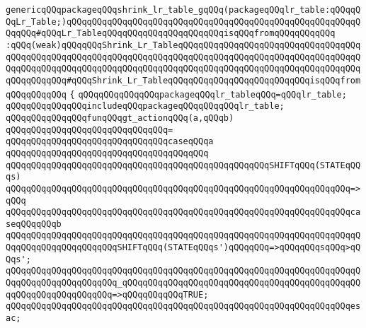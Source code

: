 \verb|genericqQQqpackageqQQqshrink_lr_table_gqQQq(packageqQQqlr_table:qQQqqQQqLr_Table;)qQQqqQQqqQQqqQQqqQQqqQQqqQQqqQQqqQQqqQQqqQQqqQQqqQQqqQQqqQQqqQQq#qQQqLr_TableqQQqqQQqqQQqqQQqqQQqqQQqisqQQqfromqQQqqQQqqQQq|\newline
\newline
\verb|:qQQq(weak)qQQqqQQqShrink_Lr_TableqQQqqQQqqQQqqQQqqQQqqQQqqQQqqQQqqQQqqQQqqQQqqQQqqQQqqQQqqQQqqQQqqQQqqQQqqQQqqQQqqQQqqQQqqQQqqQQqqQQqqQQqqQQqqQQqqQQqqQQqqQQqqQQqqQQqqQQqqQQqqQQqqQQqqQQqqQQqqQQqqQQqqQQqqQQqqQQqqQQqqQQqqQQq#qQQqShrink_Lr_TableqQQqqQQqqQQqqQQqqQQqqQQqqQQqisqQQqfromqQQqqQQqqQQq|\newline
\newline
\verb|{|\newline
\verb|qQQqqQQqqQQqqQQqpackageqQQqlr_tableqQQq=qQQqlr_table;|\newline
\newline
\verb|qQQqqQQqqQQqqQQqincludeqQQqpackageqQQqqQQqqQQqlr_table;|\newline
\newline
\verb|qQQqqQQqqQQqqQQqfunqQQqgt_actionqQQq(a,qQQqb)|\newline
\verb|qQQqqQQqqQQqqQQqqQQqqQQqqQQqqQQq=|\newline
\verb|qQQqqQQqqQQqqQQqqQQqqQQqqQQqqQQqcaseqQQqa|\newline
\verb|qQQqqQQqqQQqqQQqqQQqqQQqqQQqqQQqqQQqqQQq|\newline
\verb|qQQqqQQqqQQqqQQqqQQqqQQqqQQqqQQqqQQqqQQqqQQqqQQqqQQqSHIFTqQQq(STATEqQQqs)|\newline
\verb|qQQqqQQqqQQqqQQqqQQqqQQqqQQqqQQqqQQqqQQqqQQqqQQqqQQqqQQqqQQqqQQqqQQq=>qQQq|\newline
\verb|qQQqqQQqqQQqqQQqqQQqqQQqqQQqqQQqqQQqqQQqqQQqqQQqqQQqqQQqqQQqqQQqqQQqcaseqQQqqQQqb|\newline
\verb|qQQqqQQqqQQqqQQqqQQqqQQqqQQqqQQqqQQqqQQqqQQqqQQqqQQqqQQqqQQqqQQqqQQqqQQqqQQqqQQqqQQqqQQqqQQqSHIFTqQQq(STATEqQQqs')qQQqqQQq=>qQQqqQQqsqQQq>qQQqs';|\newline
\verb|qQQqqQQqqQQqqQQqqQQqqQQqqQQqqQQqqQQqqQQqqQQqqQQqqQQqqQQqqQQqqQQqqQQqqQQqqQQqqQQqqQQqqQQqqQQq_qQQqqQQqqQQqqQQqqQQqqQQqqQQqqQQqqQQqqQQqqQQqqQQqqQQqqQQqqQQqqQQqqQQq=>qQQqqQQqqQQqTRUE;|\newline
\verb|qQQqqQQqqQQqqQQqqQQqqQQqqQQqqQQqqQQqqQQqqQQqqQQqqQQqqQQqqQQqqQQqqQQqesac;|\newline
\newline
